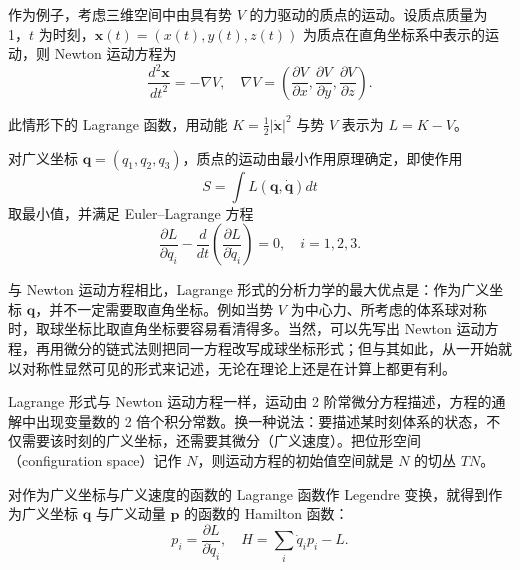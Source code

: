 作为例子，考虑三维空间中由具有势 $V$ 的力驱动的质点的运动。设质点质量为 1，$t$ 为时刻，$\bm{x}(t)=(x(t),y(t),z(t))$ 为质点在直角坐标系中表示的运动，则 Newton 运动方程为
\begin{equation}
    \frac{d^2\bm{x}}{dt^2}=-\nabla V,\quad \nabla V=\left(\frac{\partial V}{\partial x},\frac{\partial V}{\partial y},\frac{\partial V}{\partial z}\right). \tag{3.1}
\end{equation}

此情形下的 Lagrange 函数，用动能 $K=\frac{1}{2}|\dot{\bm{x}}|^2$ 与势 $V$ 表示为 $L=K-V$。

对广义坐标 $\bm{q}=(q_1,q_2,q_3)$，质点的运动由最小作用原理确定，即使作用
\begin{equation}
    S=\int L(\bm{q},\dot{\bm{q}})dt \tag{3.2}
\end{equation}
取最小值，并满足 Euler–Lagrange 方程
\begin{equation}
    \frac{\partial L}{\partial q_i}-\frac{d}{dt}\left(\frac{\partial L}{\partial\dot{q}_i}\right)=0,\quad i=1,2,3. \tag{3.3}
\end{equation}

与 Newton 运动方程相比，Lagrange 形式的分析力学的最大优点是：作为广义坐标 $\bm{q}$，并不一定需要取直角坐标。例如当势 $V$ 为中心力、所考虑的体系球对称时，取球坐标比取直角坐标要容易看清得多。当然，可以先写出 Newton 运动方程，再用微分的链式法则把同一方程改写成球坐标形式；但与其如此，从一开始就以对称性显然可见的形式来记述，无论在理论上还是在计算上都更有利。

Lagrange 形式与 Newton 运动方程一样，运动由 2 阶常微分方程描述，方程的通解中出现变量数的 2 倍个积分常数。换一种说法：要描述某时刻体系的状态，不仅需要该时刻的广义坐标，还需要其微分（广义速度）。把位形空间（configuration space）记作 $N$，则运动方程的初始值空间就是 $N$ 的切丛 $TN$。

对作为广义坐标与广义速度的函数的 Lagrange 函数作 Legendre 变换，就得到作为广义坐标 $\bm{q}$ 与广义动量 $\bm{p}$ 的函数的 Hamilton 函数：
\begin{equation}
    p_i=\frac{\partial L}{\partial\dot{q}_i},\quad H=\sum_i\dot{q}_ip_i-L. \tag{3.4}
\end{equation}

